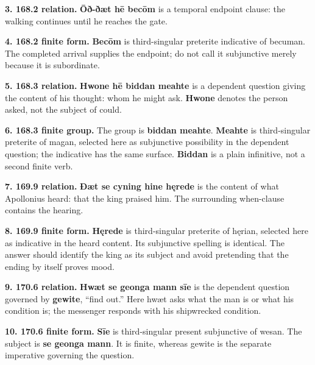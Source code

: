 \textbf{3. 168.2 relation.} \textbf{Ōð-ðæt hē becōm} is a temporal endpoint clause: the walking continues until he reaches the gate.

\textbf{4. 168.2 finite form.} \textbf{Becōm} is third-singular preterite indicative of becuman. The completed arrival supplies the endpoint; do not call it subjunctive merely because it is subordinate.

\textbf{5. 168.3 relation.} \textbf{Hwone hē biddan meahte} is a dependent question giving the content of his thought: whom he might ask. \textbf{Hwone} denotes the person asked, not the subject of could.

\textbf{6. 168.3 finite group.} The group is \textbf{biddan meahte}. \textbf{Meahte} is third-singular preterite of magan, selected here as subjunctive possibility in the dependent question; the indicative has the same surface. \textbf{Biddan} is a plain infinitive, not a second finite verb.

\textbf{7. 169.9 relation.} \textbf{Ðæt se cyning hine hęrede} is the content of what Apollonius heard: that the king praised him. The surrounding when-clause contains the hearing.

\textbf{8. 169.9 finite form.} \textbf{Hęrede} is third-singular preterite of hęrian, selected here as indicative in the heard content. Its subjunctive spelling is identical. The answer should identify the king as its subject and avoid pretending that the ending by itself proves mood.

\textbf{9. 170.6 relation.} \textbf{Hwæt se geonga mann sīe} is the dependent question governed by \textbf{gewite}, “find out.” Here hwæt asks what the man is or what his condition is; the messenger responds with his shipwrecked condition.

\textbf{10. 170.6 finite form.} \textbf{Sīe} is third-singular present subjunctive of wesan. The subject is \textbf{se geonga mann}. It is finite, whereas gewite is the separate imperative governing the question.

